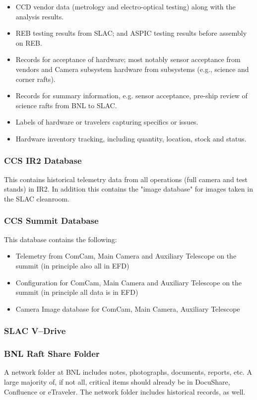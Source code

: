 \begin{itemize}
\begin{itemize}
			\item CCD vendor data (metrology and electro-optical testing) along with the analysis results.
			\item REB testing results from SLAC; and ASPIC testing results before assembly on REB.
			\item Records for acceptance of hardware; most notably sensor acceptance from vendors and Camera subsystem hardware from subsystems (e.g., science and corner rafts).
			\item Records for summary information, e.g. sensor acceptance, pre-ship review of science rafts from BNL to SLAC.
			\item Labels of hardware or travelers capturing specifics or issues.
			\item Hardware inventory tracking, including quantity, location, stock and status.
		\end{itemize}
	\end{itemize}
	\subsubsection{CCS IR2 Database}
	This contains historical telemetry data from all operations (full camera and test stands) in IR2. In addition this contains the "image database" for images taken in the SLAC cleanroom.
	\subsubsection{CCS Summit Database}
	This database contains the following:
	\begin{itemize}
		\item Telemetry from ComCam, Main Camera and Auxiliary Telescope on the summit (in principle also all in EFD)
		\item Configuration for ComCam, Main Camera and Auxiliary Telescope on the summit (in principle all data is in EFD)
		\item Camera Image database for ComCam, Main Camera, Auxiliary Telescope
	\end{itemize}

	\subsubsection{SLAC V--Drive}
	
	\subsubsection{BNL Raft Share Folder}
	A network folder at BNL includes notes, photographs, documents, reports, etc. A large majority of, if not all, critical items should already be in DocuShare, Confluence or eTraveler. The network folder includes historical records, as well.
	

